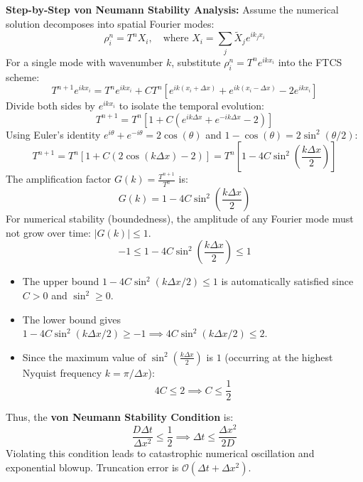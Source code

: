 \documentclass{article}
\begin{document}
\textbf{Step-by-Step von Neumann Stability Analysis:}
Assume the numerical solution decomposes into spatial Fourier modes:
$$\rho_i^n = T^n X_i, \quad \text{where } X_i = \sum_j \tilde{X}_j e^{i k_j x_i}$$
For a single mode with wavenumber $k$, substitute $\rho_i^n = T^n e^{i k x_i}$ into the FTCS scheme:
$$T^{n+1} e^{i k x_i} = T^n e^{i k x_i} + C T^n \left[ e^{i k(x_i + \Delta x)} + e^{i k(x_i - \Delta x)} - 2 e^{i k x_i} \right]$$
Divide both sides by $e^{i k x_i}$ to isolate the temporal evolution:
$$T^{n+1} = T^n \left[ 1 + C \left( e^{i k \Delta x} + e^{-i k \Delta x} - 2 \right) \right]$$
Using Euler's identity $e^{i \theta} + e^{-i \theta} = 2 \cos(\theta)$ and $1 - \cos(\theta) = 2 \sin^2(\theta/2)$:
$$T^{n+1} = T^n \left[ 1 + C(2\cos(k\Delta x) - 2) \right] = T^n \left[ 1 - 4 C \sin^2\left(\frac{k \Delta x}{2}\right) \right]$$
The amplification factor $G(k) = \frac{T^{n+1}}{T^n}$ is:
$$G(k) = 1 - 4C \sin^2\left(\frac{k \Delta x}{2}\right)$$
For numerical stability (boundedness), the amplitude of any Fourier mode must not grow over time: $|G(k)| \le 1$.
$$-1 \le 1 - 4C \sin^2\left(\frac{k \Delta x}{2}\right) \le 1$$
\begin{itemize}
    \item The upper bound $1 - 4C \sin^2(k\Delta x / 2) \le 1$ is automatically satisfied since $C > 0$ and $\sin^2 \ge 0$.
    \item The lower bound gives $1 - 4C \sin^2(k\Delta x / 2) \ge -1 \implies 4C \sin^2(k\Delta x / 2) \le 2$.
    \item Since the maximum value of $\sin^2\left(\frac{k \Delta x}{2}\right)$ is $1$ (occurring at the highest Nyquist frequency $k = \pi / \Delta x$):
    $$4C \le 2 \implies C \le \frac{1}{2}$$
\end{itemize}
Thus, the \textbf{von Neumann Stability Condition} is:
$$\frac{D \Delta t}{\Delta x^2} \le \frac{1}{2} \implies \Delta t \le \frac{\Delta x^2}{2D}$$
Violating this condition leads to catastrophic numerical oscillation and exponential blowup. Truncation error is $\mathcal{O}(\Delta t + \Delta x^2)$.
\newpage
\end{document}
